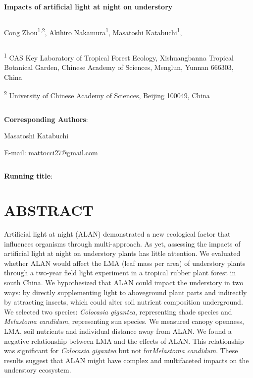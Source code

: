 \documentclass[
  12pt,
  letterpaper,
  DIV=11,
  numbers=noendperiod]{scrartcl}
\author{}
\date{}
\begin{document}
\ifdefined\Shaded\renewenvironment{Shaded}{\begin{tcolorbox}[enhanced, sharp corners, frame hidden, breakable, borderline west={3pt}{0pt}{shadecolor}, boxrule=0pt, interior hidden]}{\end{tcolorbox}}\fi

\newpage

\textbf{Impacts of artificial light at night on understory}

\[ \]

Cong Zhou\textsuperscript{1,2}, Akihiro Nakamura\textsuperscript{1},
Masatoshi Katabuchi\textsuperscript{1},

\[ \]

\textsuperscript{1} CAS Key Laboratory of Tropical Forest Ecology,
Xishuangbanna Tropical Botanical Garden, Chinese Academy of Sciences,
Menglun, Yunnan 666303, China

\textsuperscript{2} University of Chinese Academy of Sciences, Beijing
100049, China

\[ \]

\textbf{Corresponding Authors}:

Masatoshi Katabuchi

E-mail: mattocci27@gmail.com

\[ \]

\textbf{Running title}:

\newpage

\hypertarget{abstract}{%
\section{ABSTRACT}\label{abstract}}

Artificial light at night (ALAN) demonstrated a new ecological factor
that influences organisms through multi-approach. As yet, assessing the
impacts of artificial light at night on understory plants has little
attention. We evaluated whether ALAN would affect the LMA (leaf mass per
area) of understory plants through a two-year field light experiment in
a tropical rubber plant forest in south China. We hypothesized that ALAN
could impact the understory in two ways: by directly supplementing light
to aboveground plant parts and indirectly by attracting insects, which
could alter soil nutrient composition underground. We selected two
species: \emph{Colocasia gigantea}, representing shade species and
\emph{Melastoma candidum}, representing sun species. We measured canopy
openness, LMA, soil nutrients and individual distance away from ALAN. We
found a negative relationship between LMA and the effects of ALAN. This
relationship was significant for \emph{Colocasia gigantea} but not
for\emph{Melastoma candidum}. These results suggest that ALAN might have
complex and multifaceted impacts on the understory ecosystem.
\end{document}
